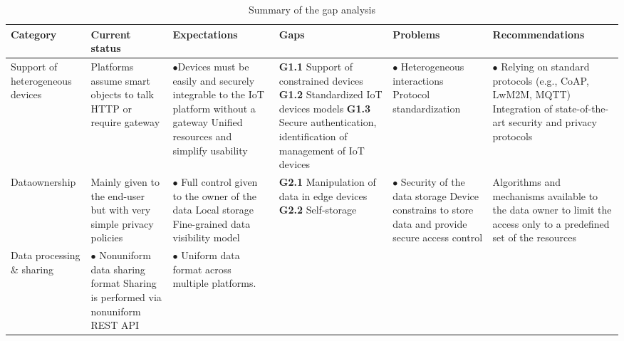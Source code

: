 \documentclass[preprint,10pt,5p]{elsarticle}
\begin{document}
\begin{table*}[!ht]
 \caption{Summary of the gap analysis}\label{tab:gapAnalysis}
 \centering
 \scriptsize
 \begin{tabular}{|m{}|m{}|m{}|
     m{}|m{}|m{}|}
  \hline
  {\small Category} & {\small Current status} & {\small Expectations} &
{\small Gaps} & {\small Problems} & {\small Recommendations}\\
  \hline\hline
Support of heterogeneous devices & 
Platforms assume smart objects to talk HTTP or require gateway & 
{\tiny$\bullet$}Devices must be easily and securely integrable to the IoT platform without a
  gateway 
  \newline{}{\tiny$\bullet$} Unified resources and simplify usability &
\textbf{G1.1} Support of constrained devices
  \newline{}\textbf{G1.2} Standardized IoT devices models
  \newline{}\textbf{G1.3} Secure authentication, identification of management of IoT devices &
{\tiny$\bullet$} Heterogeneous interactions
  \newline{}{\tiny$\bullet$} Protocol standardization
  & 
{\tiny$\bullet$} Relying on standard protocols (e.g., CoAP, LwM2M, MQTT)
  \newline{}{\tiny$\bullet$} Integration of state-of-the-art security and privacy protocols\\
  \hline
Data\newline{}ownership & 
Mainly given to the end-user but with very simple privacy policies & 
{\tiny$\bullet$} Full control given to the owner of the data
  \newline{}{\tiny$\bullet$} Local storage
  \newline{}{\tiny$\bullet$} Fine-grained data visibility model & 
\textbf{G2.1} Manipulation of data in edge devices
  \newline{}\textbf{G2.2} Self-storage &
{\tiny$\bullet$} Security of the data storage
  \newline{}{\tiny$\bullet$} Device constrains to store data and provide
  secure access control & 
Algorithms and mechanisms available to the data owner to limit the access only to a predefined set of the resources\\
  \hline
Data processing \& sharing &
{\tiny$\bullet$} Nonuniform data sharing format
  \newline{}{\tiny$\bullet$} Sharing is performed via nonuniform REST API & 
{\tiny$\bullet$} Uniform data format across multiple platforms.

\end{tabular}
\end{table*}
\end{document}
